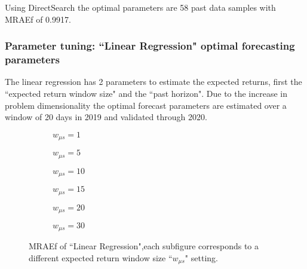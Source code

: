 Using DirectSearch\cite{DirectSearch.jl} the optimal parameters are 58 past data samples with \ac{MRAE}f of 0.9917.

\subsubsection{Parameter tuning: ``Linear Regression" optimal forecasting parameters}
The linear regression has 2 parameters to estimate the expected returns, first the ``expected return window size" and the ``past horizon". Due to the increase in problem dimensionality the optimal forecast parameters are estimated over a window of 20 days in 2019 and validated through 2020.

\begin{figure}[ht!]
    \centering
    \begin{subfigure}[b]{.495\linewidth}
         
        \caption{$w_{\mu{}s}=1$}
    \end{subfigure}
    \begin{subfigure}[b]{.495\linewidth}
         
        \caption{$w_{\mu{}s}=5$}
    \end{subfigure}
    
    \begin{subfigure}[b]{.495\linewidth}
         
        \caption{$w_{\mu{}s}=10$}
    \end{subfigure}
    \begin{subfigure}[b]{.495\linewidth}
         
        \caption{$w_{\mu{}s}=15$}
    \end{subfigure}
    
    \begin{subfigure}[b]{.495\linewidth}
         
        \caption{$w_{\mu{}s}=20$}
    \end{subfigure}
    \begin{subfigure}[b]{.495\linewidth}
         
        \caption{$w_{\mu{}s}=30$}
    \end{subfigure}
    
    \caption{MRAEf of ``Linear Regression",each subfigure corresponds to a different expected return window size ``$w_{\mu{}s}$" setting.}
    \label{fig:ch5_LR_forecast_optimization}
\end{figure}



